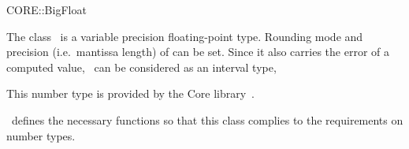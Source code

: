 \ccDefGlobalScope{}
\begin{ccRefClass}{CORE::BigFloat}

\ccDefinition

The class \ccRefName\ is a variable precision floating-point type. 
Rounding mode and precision (i.e.\ mantissa length) of 
 can be set. 
Since it also carries the error of a computed value, 
\ccRefName\ can be considered as an interval type,  

This number type is provided by the {\sc Core} library~\cite{klpy-clp-99}.

\cgal\ defines the necessary functions so that this class complies to the
requirements on number types.


\ccIsModel
{}\\
\\

\end{ccRefClass}
